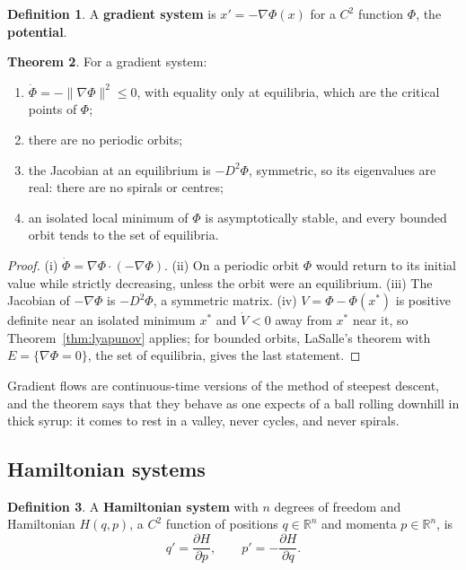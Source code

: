 \documentclass[11pt,a4paper]{article}
\numberwithin{equation}{section}
\theoremstyle{definition}
\newtheorem{thm}{Theorem}[subsection]
\newtheorem{defn}[thm]{Definition}
\begin{document}
\begin{defn}
A \textbf{gradient system} is $x' = -\nabla\Phi(x)$ for a $C^2$ function $\Phi$, the \textbf{potential}.
\end{defn}

\begin{thm}
\label{thm:gradient}
For a gradient system:
\begin{enumerate}[label=(\roman*)]
\item $\dot\Phi = -\|\nabla\Phi\|^2 \leq 0$, with equality only at equilibria, which are the critical points of $\Phi$;
\item there are no periodic orbits;
\item the Jacobian at an equilibrium is $-D^2\Phi$, symmetric, so its eigenvalues are real: there are no spirals or centres;
\item an isolated local minimum of $\Phi$ is asymptotically stable, and every bounded orbit tends to the set of equilibria.
\end{enumerate}
\end{thm}

\begin{proof}
(i) $\dot\Phi = \nabla\Phi \cdot(-\nabla\Phi)$. (ii) On a periodic orbit $\Phi$ would return to its initial value while strictly decreasing, unless the orbit were an equilibrium. (iii) The Jacobian of $-\nabla\Phi$ is $-D^2\Phi$, a
symmetric matrix. (iv) $V = \Phi - \Phi(x^*)$ is positive definite near an isolated minimum $x^*$ and $\dot V < 0$ away from $x^*$ near it, so Theorem~\ref{thm:lyapunov} applies; for bounded orbits, LaSalle's theorem with
$E = \{\nabla\Phi = 0\}$, the set of equilibria, gives the last statement.
\end{proof}

Gradient flows are continuous-time versions of the method of steepest descent, and the theorem says that they behave as one expects of a ball rolling downhill in thick syrup:
it comes to rest in a valley, never cycles, and never spirals.

\subsection{Hamiltonian systems}
\label{ssec:hamiltonian}

\begin{defn}
A \textbf{Hamiltonian system} with $n$ degrees of freedom and Hamiltonian $H(q, p)$, a $C^2$ function of positions $q \in \mathbb R^n$ and momenta $p \in \mathbb R^n$, is
\[
q' = \frac{\partial H}{\partial p}, \qquad p' = -\frac{\partial H}{\partial q} .
\]
\end{defn}
\end{document}
